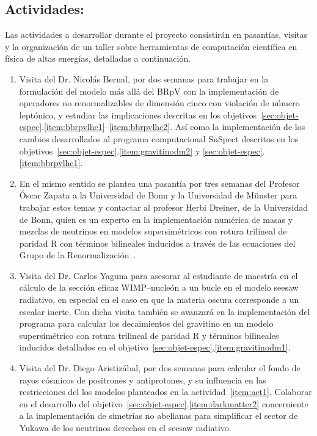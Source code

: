 \subsection{Actividades:                                   }
\label{sec:actividades}
Las actividades a desarrollar durante el proyecto consistirán en
pasantías, visitas y la organización de un taller sobre herramientas
de computación científica en física de altas energías, detalladas a
continuación.

\begin{enumerate}
\item Visita del Dr. Nicolás Bernal, por dos semanas para trabajar en
  la formulación del modelo más allá del BRpV con la implementación de
  operadores no renormalizables de dimensión cinco con violación de
  número leptónico, y estudiar las implicaciones descritas en los
  objetivos~\ref{sec:objet-espec}.\ref{item:bbrpvlhc1}--\ref{item:bbrpvlhc2}. Así
  como la implementación de los cambios desarrollados al programa
  computacional SuSpect descritos en los
  objetivos~\ref{sec:objet-espec}.\ref{item:gravitinodm2} y
  \ref{sec:objet-espec}.\ref{item:bbrpvlhc1}.
  
  \label{item:act1}

\item En el mismo sentido se plantea una pasantía por tres semanas del
  Profesor Óscar Zapata a la Universidad de Bonn y la Universidad de
  Münster para trabajar estos temas y contactar al profesor Herbi
  Dreiner, de la Universidad de Bonn, quien es un experto en la
  implementación numérica de masas y mezclas de neutrinos en modelos
  supersimétricos con rotura trilineal de paridad R con términos
  bilineales inducidos a través de las ecuaciones del Grupo de la
  Renormalización~\cite{Dreiner:2011ft}.
  \label{item:act2}
\item Visita del Dr. Carlos Yaguna para asesorar al estudiante de
  maestría en el cálculo de la sección eficaz WIMP--nucleón a un bucle
  en el modelo seesaw radiativo, en especial en el caso en que la
  materia oscura corresponde a un escalar inerte. Con dicha visita
  también se avanzará en la implementación del programa para calcular
  los decaimientos del gravitino en un modelo supersimétrico con
  rotura trilineal de paridad R y términos bilineales inducidos
  detallados en el
  objetivo~\ref{sec:objet-espec}.\ref{item:gravitinodm1}.
  \label{item:act3}

\item Visita del Dr. Diego Aristizábal, por dos semanas para  calcular el
  fondo de rayos cósmicos de positrones y antiprotones, y  su
  influencia en las restricciones del los modelos planteados en la
  actividad~\ref{item:act1}. Colaborar en el desarrollo del
  objetivo~\ref{sec:objet-espec}.\ref{item:darkmatter2} concerniente
  a la implementación de simetrías no abelianas para simplificar el
  sector de Yukawa de los neutrinos derechos en el seesaw radiativo.
  \label{item:act4}


\end{enumerate}
